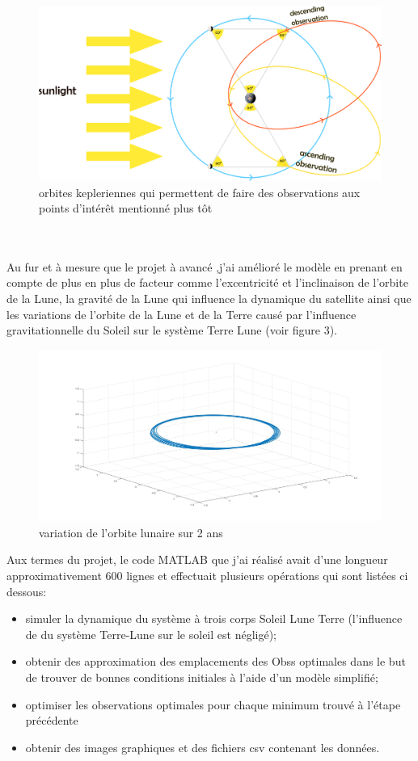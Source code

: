 \documentclass[12pt]{article} %
\begin{document}
		
		\begin{figure}[h]
			\includegraphics[width=18cm]{images/observations_main.png}
			\caption{orbites kepleriennes qui permettent de faire des observations aux points d'intérêt mentionné plus tôt}
		\end{figure}
		\\ \\
		Au fur et à mesure que le projet à avancé ,j'ai amélioré le modèle en prenant en compte de plus en plus de facteur comme l'excentricité et l'inclinaison de l'orbite de la Lune, la gravité de la Lune qui influence la dynamique du satellite ainsi que les variations de l'orbite de la Lune et de la Terre causé par l'influence gravitationnelle du Soleil sur le système Terre Lune (voir figure 3).
		\begin{figure}[h]
			\includegraphics[width=1\textwidth]{images/moon_orbit.jpg}
			\caption{variation de l'orbite lunaire sur 2 ans}
		\end{figure}
		
		Aux termes du projet, le code MATLAB que j'ai réalisé avait d'une longueur approximativement 600 lignes et effectuait plusieurs opérations qui sont listées ci dessous: 
		
		\begin{itemize}
			\item simuler la dynamique du système à trois corps Soleil Lune Terre (l'influence de du système Terre-Lune sur le soleil est négligé);
			\item obtenir des approximation des emplacements des \glspl{Obs} optimales dans le but de trouver de bonnes conditions initiales à l'aide d'un modèle simplifié;
			\item optimiser les observations optimales pour chaque minimum trouvé à l'étape précédente
			\item obtenir des images graphiques et des fichiers csv contenant les données.
		\end{itemize}
		
\end{document}
